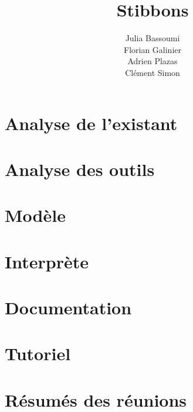 \documentclass[a4paper,11pt]{report}
\title{Stibbons}
\author{Julia Bassoumi\\Florian Galinier\\Adrien Plazas\\Clément Simon}
\begin{document}
\maketitle
\tableofcontents

\begin{abstract}
\end{abstract}

\chapter{Analyse de l'existant}




\chapter{Analyse des outils}







\chapter{Modèle}


\chapter{Interprète}





\appendix

\chapter{Documentation}




\chapter{Tutoriel}



\chapter{Résumés des réunions}








\end{document}
